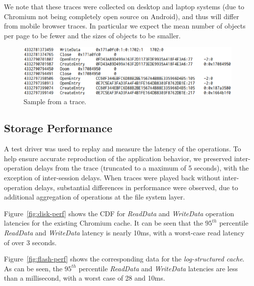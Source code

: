 \documentclass[letterpaper,twocolumn,10pt]{article}
\begin{document}
We note that these traces were collected on desktop and laptop systems (due to
Chromium not being completely open source on Android), and thus will differ from
mobile browser traces. In particular we expect the mean number of objects per
page to be fewer and the sizes of objects to be smaller.

\begin{figure}[t]
  \begin{center}
    \includegraphics[width=1.04\columnwidth]{graphs/trace}
  \end{center}
  \caption{Sample from a trace.}
  \label{fig:trace}
\vspace{-0.2in}
\end{figure}

\subsection{Storage Performance}

A test driver was used to replay and measure the latency of the operations. To
help ensure accurate reproduction of the application behavior, we preserved
inter-operation delays from the trace (truncated to a maximum of 5 seconds),
with the exception of inter-session delays.  When traces were played back
without inter-operation delays, substantial differences in performance were
observed, due to additional aggregation of operations at the file system layer.

Figure~\ref{fig:disk-perf} shows the CDF for \emph{ReadData} and
\emph{WriteData} operation latencies for the existing Chromium cache.  It can be
seen that the $95^{th}$ percentile \emph{ReadData} and \emph{WriteData} latency
is nearly 10ms, with a worst-case read latency of over 3 seconds.

Figure~\ref{fig:flash-perf} shows the corresponding data for the
\emph{log-structured cache}.  As can be seen, the $95^{th}$ percentile
\emph{ReadData} and \emph{WriteData} latencies are less than a millisecond, with
a worst case of 28 and 10ms.
\end{document}
